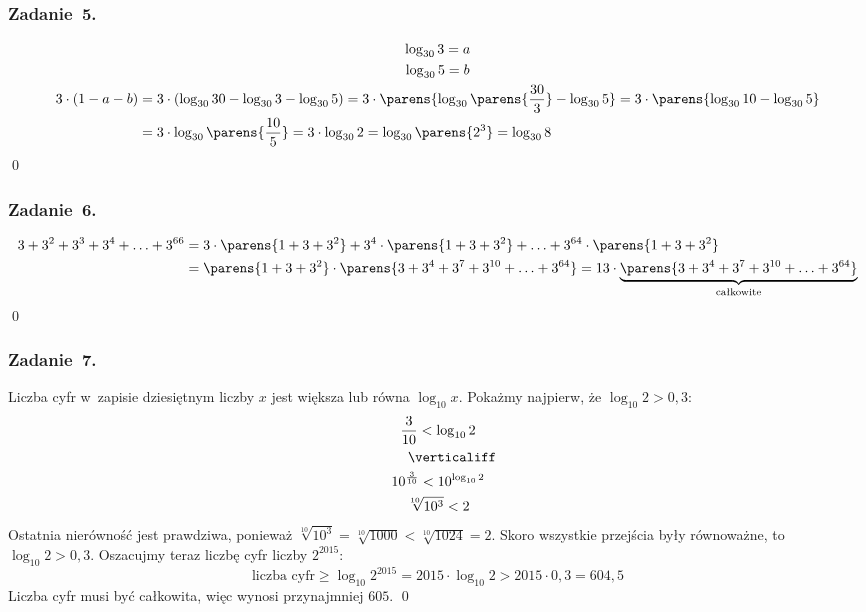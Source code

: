 \subsubsection*{Zadanie~5.}
\begin{gather*}
    \log_{30}{3} = a\\
    \log_{30}{5} = b\\
    \begin{split}
        3 \cdot (1 - a - b) &= 3 \cdot (\log_{30}{30} - \log_{30}{3} - \log_{30}{5})
            = 3 \cdot \parens{\log_{30}{\parens{\frac{30}{3}}} - \log_{30}{5}}
            = 3 \cdot \parens{\log_{30}{10} - \log_{30}{5}}\\
            &= 3 \cdot \log_{30}{\parens{\frac{10}{5}}}
            = 3 \cdot \log_{30}2
            = \log_{30}{\parens{2^3}}
            = \log_{30}{8}
    \end{split}
\end{gather*}
\qed
\subsubsection*{Zadanie~6.}
\begin{equation*}
    \begin{split}
        3 + 3^2 + 3^3 + 3^4 + \ldots + 3^{66} &= 3 \cdot \parens{1 + 3 + 3^2} + 3^4 \cdot \parens{1 + 3 + 3^2} + \ldots + 3^{64} \cdot \parens{1 + 3 + 3^2}\\
            &= \parens{1 + 3 + 3^2} \cdot \parens{3 + 3^4 + 3^7 + 3^{10} + \ldots + 3^{64}}
            = 13 \cdot \underbrace{\parens{3 + 3^4 + 3^7 + 3^{10} + \ldots + 3^{64}}}_{\text{całkowite}}
    \end{split}
\end{equation*}
\qed
\subsubsection*{Zadanie~7.}
Liczba cyfr w~zapisie dziesiętnym liczby \(x\) jest większa lub równa \(\log_{10}{x}\). Pokażmy najpierw, że \(\log_{10}{2} > 0{,}3\):
\begin{gather*}
    \frac{3}{10} < \log_{10}{2}\\
    \qquad \verticaliff\\
    10^{\frac{3}{10}} < 10^{\log_{10}{2}}\\
    \sqrt[10]{10^3} < 2
\end{gather*}
Ostatnia nierówność jest prawdziwa, ponieważ \(\sqrt[10]{10^3} = \sqrt[10]{1000} < \sqrt[10]{1024} = 2\). Skoro wszystkie przejścia były równoważne, to \(\log_{10}{2} > 0{,}3\). Oszacujmy teraz liczbę cyfr liczby \(2^{2015}\):
\begin{equation*}
    \text{liczba cyfr} \geq \log_{10}{2^{2015}} = 2015 \cdot \log_{10}{2} > 2015 \cdot 0{,}3 = 604{,}5
\end{equation*}
Liczba cyfr musi być całkowita, więc wynosi przynajmniej \(605\).
\qed
